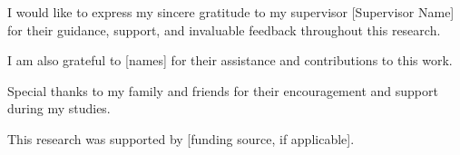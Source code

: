 I would like to express my sincere gratitude to my supervisor [Supervisor Name] for their guidance, support, and invaluable feedback throughout this research.

I am also grateful to [names] for their assistance and contributions to this work.

Special thanks to my family and friends for their encouragement and support during my studies.

This research was supported by [funding source, if applicable].
